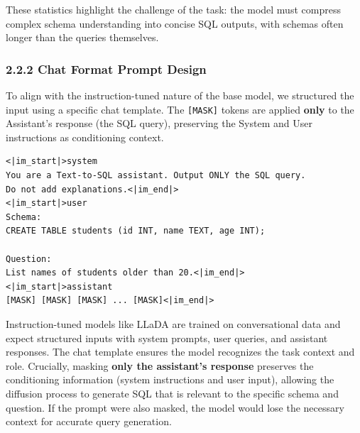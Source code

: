 \documentclass[a4paper,12pt]{article}
\begin{document}
These statistics highlight the challenge of the task: the model must compress complex schema understanding into concise SQL outputs, with schemas often longer than the queries themselves.

\subsubsection*{2.2.2 Chat Format Prompt Design}
To align with the instruction-tuned nature of the base model, we structured the input using a specific chat template. The \texttt{[MASK]} tokens are applied \textbf{only} to the Assistant's response (the SQL query), preserving the System and User instructions as conditioning context.

\begin{verbatim}
<|im_start|>system
You are a Text-to-SQL assistant. Output ONLY the SQL query.
Do not add explanations.<|im_end|>
<|im_start|>user
Schema:
CREATE TABLE students (id INT, name TEXT, age INT);

Question:
List names of students older than 20.<|im_end|>
<|im_start|>assistant
[MASK] [MASK] [MASK] ... [MASK]<|im_end|>
\end{verbatim}

Instruction-tuned models like LLaDA are trained on conversational data and expect structured inputs with system prompts, user queries, and assistant responses. The chat template ensures the model recognizes the task context and role. Crucially, masking \textbf{only the assistant's response} preserves the conditioning information (system instructions and user input), allowing the diffusion process to generate SQL that is relevant to the specific schema and question. If the prompt were also masked, the model would lose the necessary context for accurate query generation.
\end{document}
